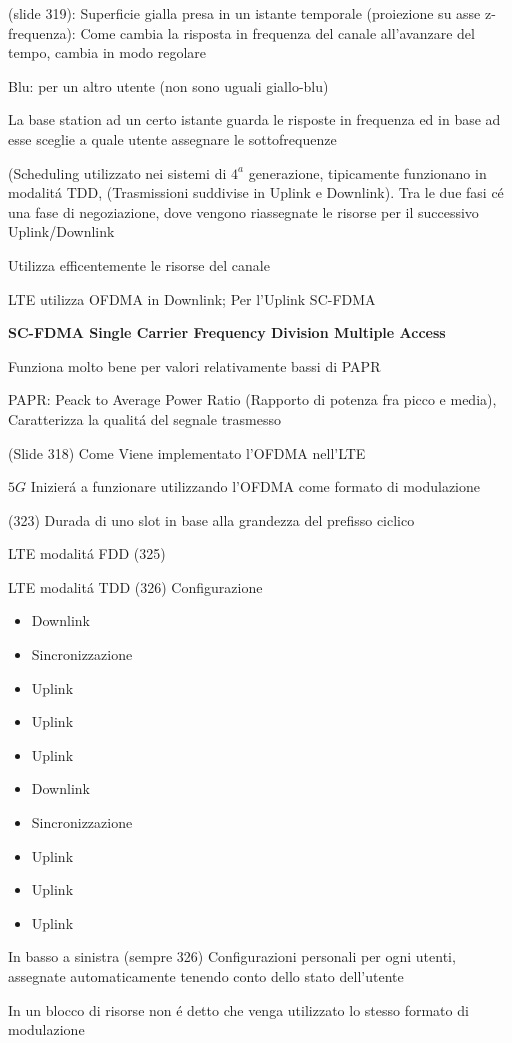 \documentclass{article}
\begin{document}
(slide 319):
Superficie gialla presa in un istante temporale (proiezione su asse z-frequenza): Come cambia la risposta in frequenza del canale all'avanzare del tempo, cambia in modo regolare

Blu: per un altro utente (non sono uguali giallo-blu)

La base station ad un certo istante guarda le risposte in frequenza ed in base ad esse sceglie a quale utente assegnare le sottofrequenze

(Scheduling utilizzato nei sistemi di $4^a$ generazione, tipicamente funzionano in modalit\'a TDD, (Trasmissioni suddivise in Uplink e Downlink). Tra le due fasi c\'e una fase di negoziazione, dove vengono riassegnate le risorse per il successivo Uplink/Downlink

Utilizza efficentemente le risorse del canale

LTE utilizza OFDMA in Downlink; Per l'Uplink SC-FDMA

\textbf{SC-FDMA Single Carrier Frequency Division Multiple Access}

Funziona molto bene per valori relativamente bassi di PAPR

PAPR: Peack to Average Power Ratio (Rapporto di potenza fra picco e media), Caratterizza la qualit\'a del segnale trasmesso

(Slide 318) Come Viene implementato l'OFDMA nell'LTE

$5G$ Inizier\'a a funzionare utilizzando l'OFDMA come formato di modulazione

(323) Durada di uno slot in base alla grandezza del prefisso ciclico

LTE modalit\'a FDD (325)

LTE modalit\'a TDD (326)
Configurazione
\begin{itemize}
    \item Downlink
    \item Sincronizzazione
    \item Uplink
    \item Uplink
    \item Uplink
    \item Downlink
    \item Sincronizzazione
    \item Uplink
    \item Uplink
    \item Uplink
\end{itemize}

In basso a sinistra (sempre 326) Configurazioni personali per ogni utenti, assegnate automaticamente tenendo conto dello stato dell'utente

In un blocco di risorse non \'e detto che venga utilizzato lo stesso formato di modulazione
\end{document}
